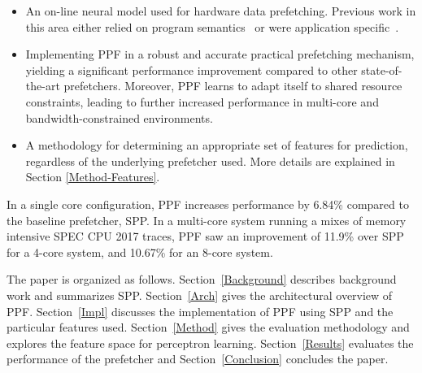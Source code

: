\begin{itemize}

\item An on-line neural model used for hardware data
  prefetching.  Previous work in this area either relied on program
  semantics~\cite{Semantics} or were application specific~\cite{Datacenter}.

\item Implementing PPF in a robust and accurate
  practical prefetching mechanism, yielding a significant performance
  improvement compared to other state-of-the-art prefetchers.
  Moreover, PPF learns to adapt itself to shared resource
  constraints, leading to further increased performance in multi-core and
  bandwidth-constrained environments.

\item A methodology for determining an appropriate set of 
  features for prediction, regardless of the underlying prefetcher used.
  More details are explained in Section \ref{Method-Features}.

\end{itemize}

In a single core configuration, PPF increases performance by 6.84\%
compared to the baseline prefetcher, SPP.  In a multi-core system running a
mixes of memory intensive SPEC CPU 2017 traces, PPF saw an improvement
of 11.9\% over SPP for a 4-core system, and 10.67\% for an 8-core system.

The paper is organized as follows. Section~\ref{Background} describes
background work and summarizes SPP.  Section~\ref{Arch} gives the 
architectural overview of PPF. Section~\ref{Impl} discusses the
implementation of PPF using SPP and the particular features used.
Section~\ref{Method} gives the evaluation methodology and explores the feature
space for perceptron learning.  Section~\ref{Results} evaluates the
performance of the prefetcher and Section~\ref{Conclusion} concludes the
paper.
